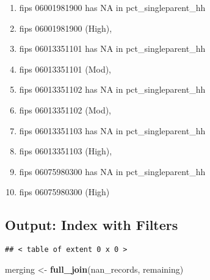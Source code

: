 \documentclass[]{article}
\newenvironment{Shaded}{\begin{snugshade}}{\end{snugshade}}
\newcommand{\KeywordTok}[1]{\textcolor[rgb]{0.13,0.29,0.53}{\textbf{#1}}}
\newcommand{\StringTok}[1]{\textcolor[rgb]{0.31,0.60,0.02}{#1}}
\newcommand{\OperatorTok}[1]{\textcolor[rgb]{0.81,0.36,0.00}{\textbf{#1}}}
\newcommand{\NormalTok}[1]{#1}
\providecommand{\tightlist}{%
  \setlength{\itemsep}{0pt}\setlength{\parskip}{0pt}}
\begin{document}
\begin{enumerate}
\def\labelenumi{\arabic{enumi}.}
\setcounter{enumi}{6}
\tightlist
\item
  fips 06001981900 has NA in pct\_singleparent\_hh\\
\item
  fips 06001981900 (High),\\
\item
  fips 06013351101 has NA in pct\_singleparent\_hh\\
\item
  fips 06013351101 (Mod),\\
\item
  fips 06013351102 has NA in pct\_singleparent\_hh\\
\item
  fips 06013351102 (Mod),\\
\item
  fips 06013351103 has NA in pct\_singleparent\_hh\\
\item
  fips 06013351103 (High),\\
\item
  fips 06075980300 has NA in pct\_singleparent\_hh\\
\item
  fips 06075980300 (High)
\end{enumerate}

\subsection{Output: Index with Filters}\label{output-index-with-filters}

\begin{Shaded}
\end{Shaded}

\begin{verbatim}
## < table of extent 0 x 0 >
\end{verbatim}

\begin{Shaded}
\begin{Highlighting}[]
\NormalTok{merging <-}\StringTok{ }\KeywordTok{full_join}\NormalTok{(nan_records, remaining)}
\end{Highlighting}
\end{Shaded}
\end{document}
